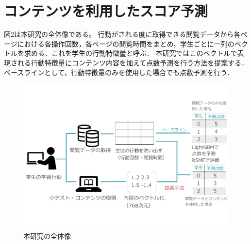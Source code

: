 \documentclass[platex,dvipdfmx,a4paper,twocolumn,base=10pt,jbase=10pt,ja=standard]{bxjsarticle}
\begin{document}



\section{コンテンツを利用したスコア予測}
\label{sec:scoreprediction}



図2は本研究の全体像である。
行動がされる度に取得できる閲覧データから各ページにおける各操作回数，各ページの閲覧時間をまとめ，学生ごとに一列のベクトルを求める．これを学生の行動特徴量と呼ぶ．
本研究ではこのベクトルで表現される行動特徴量にコンテンツ内容を加えて点数予測を行う方法を提案する．
ベースラインとして，行動特徴量のみを使用した場合でも点数予測を行う．


\begin{figure}[h]
  \centering
  \includegraphics[scale = 0.23]{zentaizo.pdf}
  \vspace{-5mm}
  \caption{本研究の全体像}
  \label{fig:本研究の全体像}
\end{figure}
\end{document}
